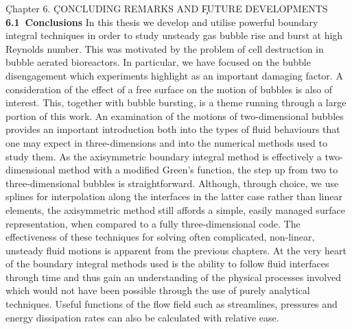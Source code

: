 \vbox{
\c{\bigrmb Chapter 6.}
\vskip 1cm
\c{\bigrm CONCLUDING REMARKS AND}
\c{\bigrm FUTURE DEVELOPMENTS}
\vskip 15pt
\hbox{\bf 6.1 Conclusions}
\vskip 5pt
}
In this thesis we develop and utilise powerful boundary integral
techniques in order to study unsteady gas bubble rise and burst
at high Reynolds number.
This was motivated by the problem of cell destruction
in bubble aerated bioreactors. In particular, we have focused on the 
bubble disengagement which experiments highlight as an important
damaging factor. A consideration of the effect of a free surface on 
the motion of bubbles is also of interest. This, together with bubble bursting,
is a theme running through a large portion of this work.
An examination of the motions of two-dimensional bubbles provides an
important introduction both into the types of fluid behaviours that 
one may expect in three-dimensions and into the numerical methods used to 
study them. As the axisymmetric boundary integral method is effectively
a two-dimensional method with a modified Green's function, the step up
from two to three-dimensional bubbles is straightforward.
Although, through choice, we use splines for interpolation along the
interfaces in the latter case rather than linear elements,
the axisymmetric method still affords a simple, easily managed
surface representation, when compared to a fully three-dimensional 
code. The effectiveness of these techniques for solving  
often complicated, non-linear, unsteady fluid motions is apparent from the
previous chapters. At the very heart of the boundary integral methods used
is the ability to follow fluid interfaces through time and thus
gain an understanding of the physical processes involved which would not
have been possible through the use of purely analytical techniques.
Useful functions of the flow field such as streamlines, pressures and 
energy dissipation rates can also be calculated with relative ease.

